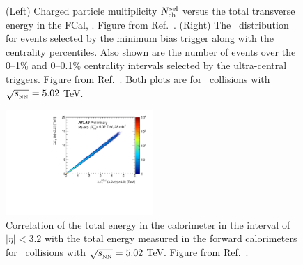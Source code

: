 \begin{figure}
\begin{subfigure}{.45\textwidth}
          \caption{}
          \label{fig:fcal_distr}
\end{subfigure}
\caption{(Left) Charged particle multiplicity $N_{\rm ch}^{\rm sel}$ versus the total transverse energy in the FCal, \ETfcal.
Figure from Ref.~\cite{perfPlots}.
(Right) The \ETfcal\ distribution for events selected by the minimum bias trigger along with the centrality percentiles.
Also shown are the number of events over the 0--1\% and 0--0.1\% centrality intervals selected by the ultra-central triggers.
Figure from Ref.~\cite{Aaboud:2018ves}.
Both plots are for \pbpb\ collisions with $\mbox{$\sqrt{s_{_\text{NN}}}$} = 5.02$ TeV.}
\label{}
\end{figure}


\begin{figure}[ht]
	\centering
        \includegraphics[width=0.5\textwidth]{figures/setup/fcal_barrel}
          \caption{Correlation of the total energy in the calorimeter in the interval of $|\eta| < 3.2$ with the total energy measured in the forward calorimeters for \pbpb\ collisions with $\mbox{$\sqrt{s_{_\text{NN}}}$} = 5.02$ TeV.
          Figure from Ref.~\cite{perfPlots}.}
          \label{fig:fcal_barrel}
\end{figure}


